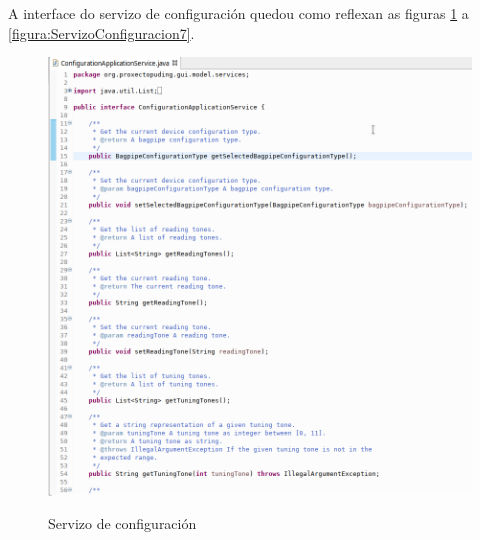    A interface do servizo de configuración quedou como reflexan as figuras
   \ref{figura:ServizoConfiguracion1} a \ref{figura:ServizoConfiguracion7}. \\
   
   \begin{figure}[htbp]
    \centering
    \includegraphics[scale=0.6, keepaspectratio=true]{./imagenes/servizo-configuracion-1.png} \\
    \caption{Servizo de configuración}
    \label{figura:ServizoConfiguracion1}
   \end{figure}
   
